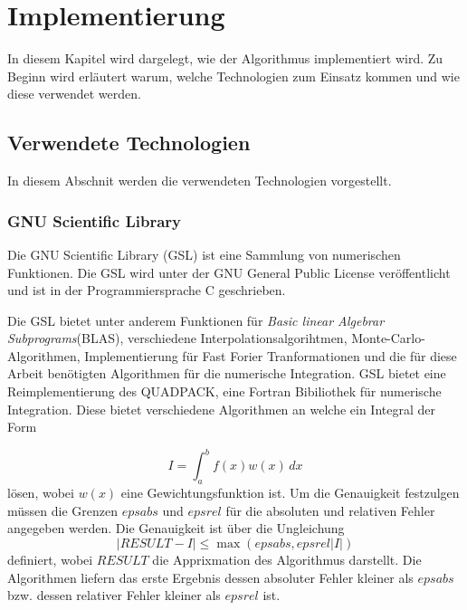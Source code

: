 \chapter{Implementierung}\label{impl}

In diesem Kapitel wird dargelegt, wie der Algorithmus implementiert wird. Zu Beginn wird erläutert warum, welche Technologien zum Einsatz kommen und wie diese verwendet werden.
\section{Verwendete Technologien}

In diesem Abschnit werden die verwendeten Technologien vorgestellt. 


\subsection{GNU Scientific Library}

Die GNU Scientific Library (GSL) ist eine Sammlung von numerischen Funktionen\cite{gsl}. Die GSL wird unter der GNU General Public License veröffentlicht und ist in der Programmiersprache C geschrieben.

Die GSL bietet unter anderem Funktionen für \textit{Basic linear Algebrar Subprograms}(BLAS), verschiedene Interpolationsalgorihtmen, Monte-Carlo-Algorithmen, Implementierung für Fast Forier Tranformationen und die für diese 
Arbeit benötigten Algorithmen für die numerische Integration.
GSL bietet eine Reimplementierung des QUADPACK\cite{quadpack}, eine Fortran Bibiliothek für numerische Integration.
Diese bietet verschiedene Algorithmen an welche ein Integral der Form

\begin{equation*}
    I = \int_{a}^{b} f(x) w(x) \,dx
\end{equation*}
lösen, wobei $w(x)$ eine Gewichtungsfunktion ist. Um die Genauigkeit festzulgen müssen die Grenzen $epsabs$ und $epsrel$ für die absoluten und relativen Fehler angegeben werden.
Die Genauigkeit ist über die Ungleichung 
\begin{equation*}
    |RESULT - I| \leq \max{(epsabs, epsrel |I|)}
\end{equation*}
definiert, wobei $RESULT$ die Apprixmation des Algorithmus darstellt. Die Algorithmen liefern das erste Ergebnis dessen absoluter Fehler kleiner als $epsabs$ bzw. dessen relativer Fehler kleiner als $epsrel$ ist.



